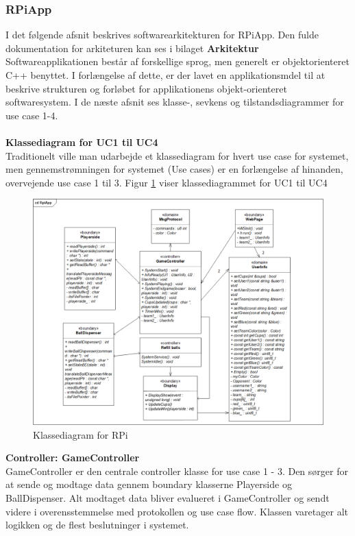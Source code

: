 \documentclass[Rapport/Rapport_main.tex]{subfiles}
\begin{document}
\subsubsection{RPiApp}
I det følgende afsnit beskrives softwarearkitekturen for RPiApp. Den fulde dokumentation for arkiteturen kan ses i bilaget \textbf{Arkitektur}  \\
Softwareapplikationen består af forskellige sprog, men generelt er objektorienteret C++ benyttet. I forlængelse af dette, er der lavet en applikationsmdel til at beskrive strukturen og forløbet for applikationens objekt-orienteret softwaresystem. I de næste afsnit ses klasse-, sevkens og tilstandsdiagrammer for use case 1-4. \\\\
\textbf{Klassediagram for UC1 til UC4}\\
Traditionelt ville man udarbejde et klassediagram for hvert use case for systemet, men gennemstrømningen for systemet (Use cases) er en forlængelse af hinanden, overvejende use case 1 til 3. Figur \ref{fig:CD_RPI_RAP} viser klassediagrammet for UC1 til UC4
\begin{figure}[H]
    \centering
    \includegraphics[width=\textwidth]{Arkitektur/Softwarearkitektur/Applikationsmodel/RPi/graphics_RPi/Class.png}
    \caption{Klassediagram for RPi}
    \label{fig:CD_RPI_RAP}
\end{figure}
\textbf{Controller:  GameController}\\
GameController er den centrale controller klasse for use case 1 - 3. Den sørger for at sende og modtage data gennem boundary klasserne Playerside og BallDispenser. Alt modtaget data bliver evalueret i GameController og sendt videre i overensstemmelse med protokollen og use case flow. Klassen varetager alt logikken og de flest beslutninger i systemet.\\\\
\end{document}
